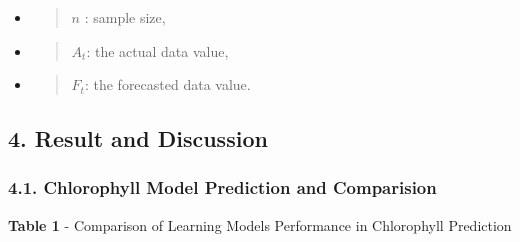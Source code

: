 \documentclass[
]{article}
\begin{document}
\begin{itemize}
\item
  \begin{quote}
  \(n\) : sample size,
  \end{quote}
\item
  \begin{quote}
  \(A_{t}\): the actual data value,
  \end{quote}
\item
  \begin{quote}
  \(F_{t}\): the forecasted data value.
  \end{quote}
\end{itemize}

\hypertarget{result-and-discussion}{%
\subsection{\texorpdfstring{\textbf{4. Result and
Discussion}}{4. Result and Discussion}}\label{result-and-discussion}}

\hypertarget{chlorophyll-model-prediction-and-comparision}{%
\subsubsection{\texorpdfstring{\textbf{4.1. Chlorophyll Model Prediction
and
Comparision}}{4.1. Chlorophyll Model Prediction and Comparision}}\label{chlorophyll-model-prediction-and-comparision}}

\textbf{Table 1} - Comparison of Learning Models Performance in
Chlorophyll Prediction
\end{document}
